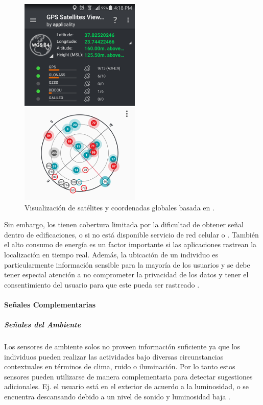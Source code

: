 \begin{figure}[!tbph]
\begin{centering}
\includegraphics[scale=0.8]{capitulo-4/graphics/gps}
\par\end{centering}
\caption[Coordenadas por GPS]{\label{fig4:gps}Visualización de satélites y coordenadas globales
basada en .}
\end{figure}

Sin embargo, los  tienen cobertura limitada por la dificultad
de obtener señal dentro de edificaciones, o si no está disponible
servicio de red celular o . También el alto consumo de
energía es un factor importante si las aplicaciones rastrean la localización
en tiempo real. Además, la ubicación de un individuo es particularmente
información sensible para la mayoría de los usuarios y se debe tener
especial atención a no comprometer la privacidad de los datos y tener
el consentimiento del usuario para que este pueda ser rastreado \cite{LaraLabrador2013}.

\paragraph{Señales Complementarias}

\subparagraph{Señales del Ambiente}

Los sensores de ambiente solos no proveen información suficiente ya
que los individuos pueden realizar las actividades bajo diversas circunstancias
contextuales en términos de clima, ruido o iluminación. Por lo tanto
estos sensores pueden utilizarse de manera complementaria para detectar
sugestiones adicionales. Ej. el usuario está en el exterior de acuerdo
a la luminosidad, o se encuentra descansando debido a un nivel de
sonido y luminosidad baja \cite{LaraLabrador2013}.

